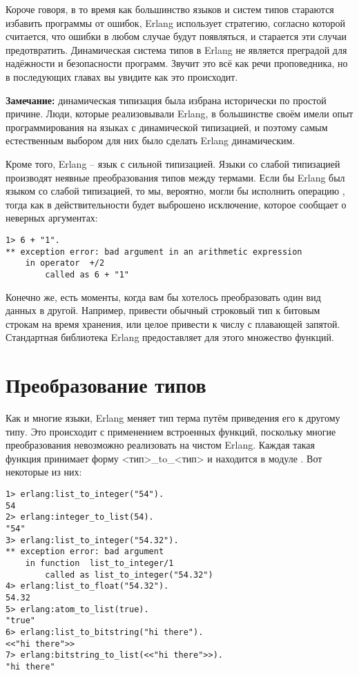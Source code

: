 Короче говоря, в то время как большинство языков и систем типов стараются избавить программы от ошибок, Erlang использует стратегию, согласно которой считается, что ошибки в любом случае будут появляться, и старается эти случаи предотвратить.
Динамическая система типов в Erlang не является преградой для надёжности и безопасности программ.
Звучит это всё как речи проповедника, но в последующих главах вы увидите как это происходит.\\
\colorbox{lgray}
{
    \begin{minipage}{\linewidth}
\textbf{Замечание:} динамическая типизация была избрана исторически по простой причине.
Люди, которые реализовывали Erlang, в большинстве своём имели опыт программирования на языках с динамической типизацией, и поэтому самым естественным выбором для них было сделать Erlang динамическим.
    \end{minipage}
}

Кроме того, Erlang \--- язык с сильной типизацией.
Языки со слабой типизацией производят неявные преобразования типов между термами.
Если бы Erlang был языком со слабой типизацией, то мы, вероятно, могли бы исполнить операцию , тогда как в действительности будет выброшено исключение, которое сообщает о неверных аргументах:
\begin{lstlisting}[style=erlang]
1> 6 + "1".
** exception error: bad argument in an arithmetic expression
    in operator  +/2
        called as 6 + "1"
\end{lstlisting}

Конечно же, есть моменты, когда вам бы хотелось преобразовать один вид данных в другой.
Например, привести обычный строковый тип к битовым строкам на время хранения, или целое привести к числу с плавающей запятой.
Стандартная библиотека Erlang предоставляет для этого множество функций.
\section{Преобразование типов}
Как и многие языки, Erlang меняет тип терма путём приведения его к другому типу.
Это происходит с применением встроенных функций, поскольку многие преобразования невозможно реализовать на чистом Erlang.
Каждая такая функция принимает форму <тип>\_to\_<тип> и находится в модуле .
Вот некоторые из них:
\begin{lstlisting}[style=erlang]
1> erlang:list_to_integer("54").
54
2> erlang:integer_to_list(54).
"54"
3> erlang:list_to_integer("54.32").
** exception error: bad argument
    in function  list_to_integer/1
        called as list_to_integer("54.32")
4> erlang:list_to_float("54.32").
54.32
5> erlang:atom_to_list(true).
"true"
6> erlang:list_to_bitstring("hi there").
<<"hi there">>
7> erlang:bitstring_to_list(<<"hi there">>).
"hi there"
\end{lstlisting}


